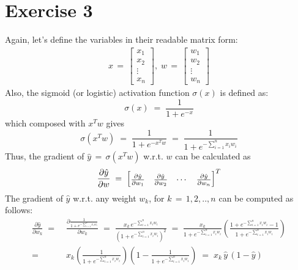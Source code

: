 \documentclass[12pt]{report}
\begin{document}
\clearpage

\section*{Exercise 3}
Again, let's define the variables in their readable matrix form:
\begin{align*}
    x \,=\,
    \begin{bmatrix}
        x_1 \\
        x_2 \\
        \vdots \\
        x_n
    \end{bmatrix}
    ,\; w \,=\,
    \begin{bmatrix}
        w_1 \\
        w_2 \\
        \vdots \\
        w_n
    \end{bmatrix}
\end{align*}
Also, the sigmoid (or logistic) activation function $\sigma(x)$ is defined as:
$$\sigma(x) \;=\; \frac{1}{1 + e^{-x}}$$
which composed with $x^Tw$ gives
$$\sigma(x^Tw) \;=\; \frac{1}{1 + e^{-x^Tw}}
               \;=\; \frac{1}{1 + e^{-\sum\limits_{i=1}^n x_iw_i}}$$
Thus, the gradient of $\hat{y} \,=\, \sigma(x^Tw)$ w.r.t. $w$ can be calculated as
\begin{align*}
    \frac{\partial \hat{y}}{\partial w} \;=\;
    \renewcommand\arraystretch{1.5}
    \begin{bmatrix}
        \frac{\partial \hat{y}}{\partial w_1} & \frac{\partial \hat{y}}{\partial w_2} &
        \cdots & \frac{\partial \hat{y}}{\partial w_n}
    \end{bmatrix}^T
\end{align*}
The gradient of $\hat{y}$ w.r.t. any weight $w_k$, for $k \,=\, 1, 2, .., n$ can be computed
as follows:
\begin{align*}
    \frac{\partial \hat{y}}{\partial w_k} \;=&\;
    \frac{\partial \frac{1}{1 + e^{-\sum_{i=1}^n x_iw_i}}}{\partial w_k} \;=\;
    \frac{x_k \, e^{-\sum_{i=1}^n x_iw_i}}{\left(1 + e^{-\sum_{i=1}^n x_iw_i}\right)^2} \;=\;
    \frac{x_k}{1 + e^{-\sum_{i=1}^n x_iw_i}} \left(\frac{1 + e^{-\sum_{i=1}^n x_iw_i} - 1}
                   {1 + e^{-\sum_{i=1}^n x_iw_i}} \right) \\
    =&\; x_k \left(\frac{1}{1 + e^{-\sum_{i=1}^n x_iw_i}}\right)
             \left(1 - \frac{1}{1 + e^{-\sum_{i=1}^n x_iw_i}} \right) \;=\;
    x_k \,\hat{y} \, (1 - \hat{y})
\end{align*}
\end{document}
